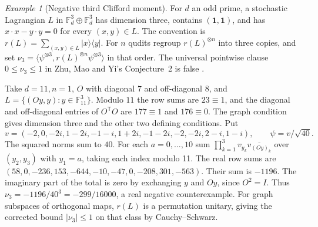 \documentclass[aps,pra,onecolumn,superscriptaddress,nofootinbib,10pt]{revtex4-2}
\theoremstyle{definition}
\theoremstyle{remark}
\newtheorem{example}[theorem]{Example}
\begin{document}
\begin{example}[Negative third Clifford moment]\label{ob:thirdmoment}
For \(d\) an odd prime, a stochastic Lagrangian \(L\) in
\(\mathbb F_d^3\oplus\mathbb F_d^3\) has dimension three,
contains \((\mathbf1,\mathbf1)\), and has
\(x\cdot x-y\cdot y=0\) for every \((x,y)\in L\).
The convention is \(r(L)=\sum_{(x,y)\in L}|x\rangle\langle y|\).
For \(n\) qudits regroup \(r(L)^{\otimes n}\) into three copies,
and set \(\nu_3=\langle\psi^{\otimes3},r(L)^{\otimes n}
\psi^{\otimes3}\rangle\) in that order. The universal pointwise
clause \(0\le\nu_3\le1\) in Zhu, Mao and Yi's Conjecture~2
is false \cite[Eq.~(43) and Conjecture~2]{obr:zmy}.

Take \(d=11,n=1\), \(O\) with diagonal \(7\) and off-diagonal
\(8\), and \(L=\{(Oy,y):y\in\mathbb F_{11}^3\}\).
Modulo \(11\) the row sums are \(23\equiv1\), and the diagonal
and off-diagonal entries of \(O^{\mathsf T}O\) are \(177\equiv1\)
and \(176\equiv0\). The graph condition gives dimension
three and the other two defining conditions. Put
\[
 v=(-2,0,-2i,1-2i,-1-i,1+2i,-1-2i,-2,-2i,2-i,1-i),
 \qquad \psi=v/\sqrt{40}.
\]
The squared norms sum to \(40\). For each \(a=0,\ldots,10\)
sum \(\prod_{k=1}^3 v_{y_k}\overline{v_{(Oy)_k}}\) over
\((y_2,y_3)\) with \(y_1=a\), taking each index modulo 11.
The real row sums are
\((58,0,-236,153,-644,-10,-47,0,-208,301,-563)\).
Their sum is \(-1196\). The imaginary part of the total is zero
by exchanging \(y\) and \(Oy\), since \(O^2=I\).
Thus \(\nu_3=-1196/40^3=-299/16000\), a real negative
counterexample. For graph subspaces of orthogonal maps, \(r(L)\) is a
permutation unitary, giving the corrected bound \(|\nu_3|\le1\) on
that class by Cauchy--Schwarz.
\end{example}
\end{document}

